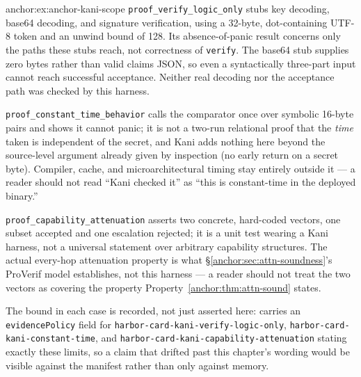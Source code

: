 \begin{pdSolution}{anchor:ex:anchor-kani-scope}
\texttt{proof\_verify\_logic\_only} stubs key decoding, base64 decoding, and signature verification, using a 32-byte, dot-containing UTF-8 token and an unwind bound of 128. Its absence-of-panic result concerns only the paths these stubs reach, not correctness of \texttt{verify}. The base64 stub supplies zero bytes rather than valid claims JSON, so even a syntactically three-part input cannot reach successful acceptance. Neither real decoding nor the acceptance path was checked by this harness.

\texttt{proof\_constant\_time\_behavior} calls the comparator once over symbolic 16-byte pairs and shows it cannot panic; it is not a two-run relational proof that the \emph{time} taken is independent of the secret, and Kani adds nothing here beyond the source-level argument already given by inspection (no early return on a secret byte). Compiler, cache, and microarchitectural timing stay entirely outside it --- a reader should not read ``Kani checked it'' as ``this is constant-time in the deployed binary.''

\texttt{proof\_capability\_attenuation} asserts two concrete, hard-coded vectors, one subset accepted and one escalation rejected; it is a unit test wearing a Kani harness, not a universal statement over arbitrary capability structures. The actual every-hop attenuation property is what \S\ref{anchor:sec:attn-soundness}'s ProVerif model establishes, not this harness --- a reader should not treat the two vectors as covering the property Property~\ref{anchor:thm:attn-sound} states.

The bound in each case is recorded, not just asserted here:  carries an \texttt{evidencePolicy} field for \texttt{harbor-card-kani-}\allowbreak\texttt{verify-logic-only}, \texttt{harbor-card-kani-}\allowbreak\texttt{constant-time}, and \texttt{harbor-card-kani-}\allowbreak\texttt{capability-attenuation} stating exactly these limits, so a claim that drifted past this chapter's wording would be visible against the manifest rather than only against memory.
\end{pdSolution}
